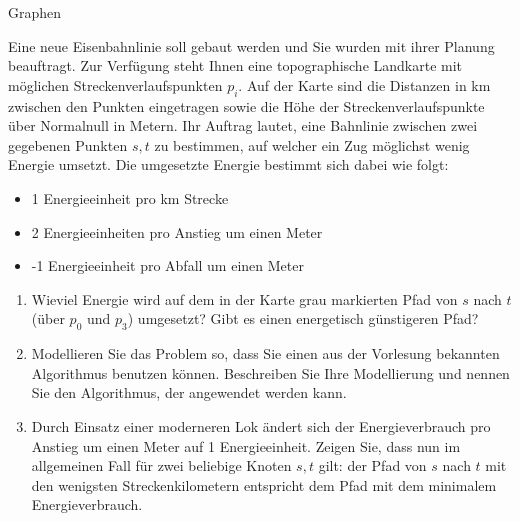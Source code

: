 \documentclass{article}
\begin{document}
\begin{exercise}{Graphen}
  
  Eine neue Eisenbahnlinie soll gebaut werden und Sie wurden mit ihrer Planung beauftragt. Zur Verfügung steht Ihnen eine topographische Landkarte mit möglichen Streckenverlaufspunkten $p_i$. Auf der Karte sind die Distanzen in km zwischen den Punkten eingetragen sowie die Höhe der Streckenverlaufspunkte über Normalnull in Metern. Ihr Auftrag lautet, eine Bahnlinie zwischen zwei gegebenen Punkten $s, t$ zu bestimmen, auf welcher ein Zug möglichst wenig Energie umsetzt. Die umgesetzte Energie bestimmt sich dabei wie folgt:
  \begin{itemize}
    \item 1 Energieeinheit pro km Strecke
    \item 2 Energieeinheiten pro Anstieg um einen Meter
    \item -1 Energieeinheit pro Abfall um einen Meter
  \end{itemize}
  \begin{enumerate}
    \item Wieviel Energie wird auf dem in der Karte grau markierten Pfad von $s$ nach $t$ (über $p_0$ und $p_3$) umgesetzt? Gibt es einen energetisch günstigeren Pfad?
    \item Modellieren Sie das Problem so, dass Sie einen aus der Vorlesung bekannten Algorithmus benutzen können. Beschreiben Sie Ihre Modellierung und nennen Sie den Algorithmus, der angewendet werden kann.
    \item Durch Einsatz einer moderneren Lok ändert sich der Energieverbrauch pro Anstieg um einen Meter auf 1 Energieeinheit. Zeigen Sie, dass nun im allgemeinen Fall für zwei beliebige Knoten $s, t$ gilt: der Pfad von $s$ nach $t$ mit den wenigsten Streckenkilometern entspricht dem Pfad mit dem minimalem Energieverbrauch.
  \end{enumerate}

  \begin{solution}

  \end{solution}
\end{exercise}
\end{document}

